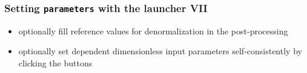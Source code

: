\documentclass[10pt]{beamer}
\begin{document}
{
\begin{frame}[fragile]
  \frametitle{Setting {\tt parameters} with the launcher VII}

\vspace{5.25cm}

\begin{block}{}
\begin{itemize}
\item optionally fill reference values for denormalization in the post-processing
\item optionally set dependent dimensionless input parameters self-consistently by clicking the buttons
\end{itemize}
\end{block}

\end{frame}
}

\end{document}
